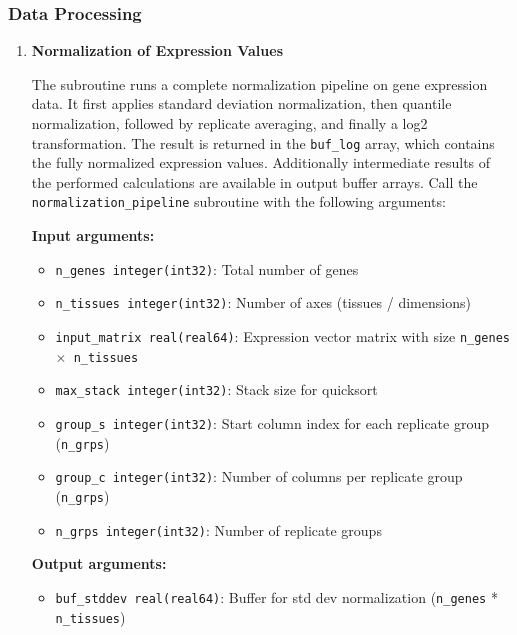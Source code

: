 \documentclass[11pt]{article}
\begin{document}
\subsubsection{Data Processing}
\begin{enumerate}
	\item \textbf{Normalization of Expression Values}
	      
	      The subroutine runs a complete normalization pipeline on gene expression data.
	      It first applies standard deviation normalization, then quantile normalization,
	      followed by replicate averaging, and finally a log2 transformation. The
	      result is returned in the \texttt{buf\_log} array, which contains the
	      fully normalized expression values. Additionally intermediate results of the
	      performed calculations are available in output buffer arrays. Call the
	      \texttt{normalization\_pipeline} subroutine with the following arguments:
	      
	      \textbf{Input arguments:}
	      \begin{itemize}
	      	\item \texttt{n\_genes integer(int32)}: Total number of genes
	      	      
	      	\item \texttt{n\_tissues integer(int32)}: Number of axes (tissues /
	      	      dimensions)
	      	      
	      	\item \texttt{input\_matrix real(real64)}: Expression vector matrix with
	      	      size \texttt{n\_genes $\times$ n\_tissues}
	      	      
	      	\item \texttt{max\_stack integer(int32)}: Stack size for quicksort
	      	      
	      	\item \texttt{group\_s integer(int32)}: Start column index for each replicate
	      	      group (\texttt{n\_grps})
	      	      
	      	\item \texttt{group\_c integer(int32)}: Number of columns per replicate group
	      	      (\texttt{n\_grps})
	      	      
	      	\item \texttt{n\_grps integer(int32)}: Number of replicate groups
	      \end{itemize}
	      
	      \textbf{Output arguments:}
	      \begin{itemize}
	      	\item \texttt{buf\_stddev real(real64)}: Buffer for std dev normalization
	      	      (\texttt{n\_genes} * \texttt{n\_tissues})
	      	      

\end{itemize}
\end{enumerate}
\end{document}
